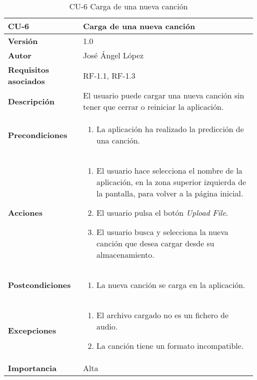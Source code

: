 \begin{table}[p]
	\centering
	\begin{tabularx}{\linewidth}{ p{} p{} }
		\toprule
		\textbf{CU-6}    & \textbf{Carga de una nueva canción}\\
		\toprule
		\textbf{Versión}              & 1.0    \\
		\textbf{Autor}                & José Ángel López \\
		\textbf{Requisitos asociados} & RF-1.1, RF-1.3 \\
		\textbf{Descripción}          & El usuario puede cargar una nueva canción sin tener que cerrar o reiniciar la aplicación. \\
		\textbf{Precondiciones}        & 
		\begin{enumerate}		    
			\def\labelenumi{\arabic{enumi}.}
			\tightlist
			\item La aplicación ha realizado la predicción de una canción.
		\end{enumerate}\\
		\textbf{Acciones}             &
		\begin{enumerate}
			\def\labelenumi{\arabic{enumi}.}
			\tightlist
			\item El usuario hace selecciona el nombre de la aplicación, en la zona superior izquierda de la pantalla, para volver a la página inicial.
			\item El usuario pulsa el botón \textit{Upload File}.
			\item El usuario busca y selecciona la nueva canción que desea cargar desde su almacenamiento.
		\end{enumerate}\\
		\textbf{Postcondiciones} &
		\begin{enumerate}
			\def\labelenumi{\arabic{enumi}.}
			\tightlist
			\item La nueva canción se carga en la aplicación.
		\end{enumerate}\\
		\textbf{Excepciones} &
		\begin{enumerate}
			\def\labelenumi{\arabic{enumi}.}
			\tightlist
			\item El archivo cargado no es un fichero de audio.
			\item La canción tiene un formato incompatible.
		\end{enumerate}\\
		\textbf{Importancia}          & Alta \\
		\bottomrule
	\end{tabularx}
	\caption{CU-6 Carga de una nueva canción}
\end{table}